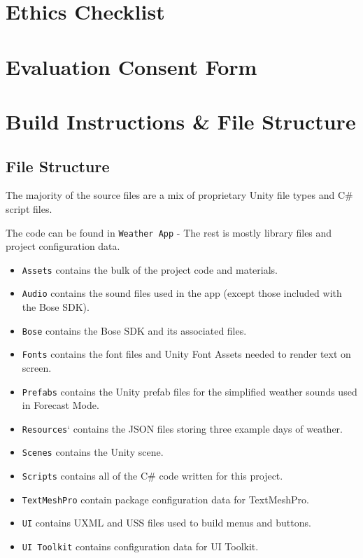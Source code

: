 \documentclass{l4proj}
\begin{document}
\begin{appendices}
\chapter{Ethics Checklist}


\chapter{Evaluation Consent Form}


\chapter{Build Instructions \& File Structure}

\section{File Structure}
The majority of the source files are a mix of proprietary Unity file types and C\# script files.

The code can be found in \texttt{Weather App} - The rest is mostly library files and project configuration data.
\begin{itemize}
    \item \texttt{Assets} contains the bulk of the project code and materials.
    \item \texttt{Audio} contains the sound files used in the app (except those included with the Bose SDK).
    \item \texttt{Bose} contains the Bose SDK and its associated files.
    \item \texttt{Fonts} contains the font files and Unity Font Assets needed to render text on screen.
    \item \texttt{Prefabs} contains the Unity prefab files for the simplified weather sounds used in Forecast Mode.
    \item \texttt{Resources}` contains the JSON files storing three example days of weather.
    \item \texttt{Scenes} contains the Unity scene.
    \item \texttt{Scripts} contains all of the C\# code written for this project.
    \item \texttt{TextMeshPro} contain package configuration data for TextMeshPro.
    \item \texttt{UI} contains UXML and USS files used to build menus and buttons.
    \item \texttt{UI Toolkit} contains configuration data for UI Toolkit.
\end{itemize}


\end{appendices}
\end{document}
